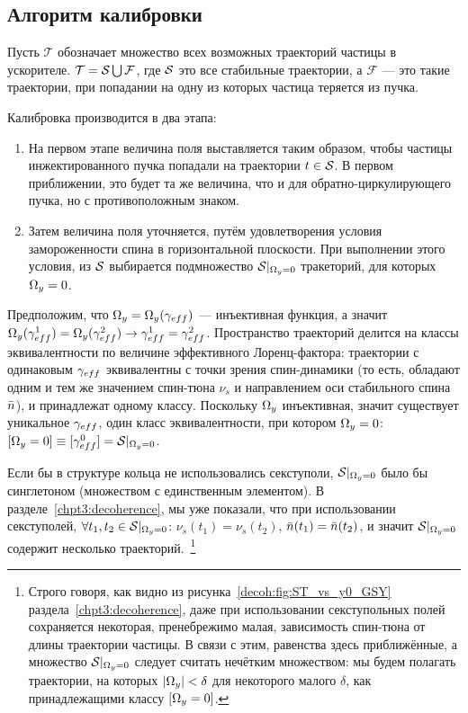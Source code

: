 
\newcommand{\Traj}{\mathcal T}
\newcommand{\Fail}{\mathcal F}
\renewcommand{\D}{\mathcal D}

\subsection{Алгоритм калибровки}
Пусть $\Traj$ обозначает множество всех возможных траекторий частицы в ускорителе. $\Traj = \Stab \bigcup \Fail$,
где $\Stab$ это все стабильные траектории, а $\Fail$ --- это такие траектории,
при попадании на одну из которых частица теряется из пучка.

Калибровка производится в два этапа:
\begin{enumerate}
\item На первом этапе величина поля выставляется таким образом, чтобы частицы инжектированного пучка
попадали на траектории $t\in \Stab$. В первом приближении, это будет та же величина,
что и для обратно-циркулирующего пучка, но с противоположным знаком.
\item Затем величина поля уточняется, путём удовлетворения условия замороженности спина в горизонтальной
плоскости. При выполнении этого условия, из $\Stab$ выбирается подмножество $\Stab*$ тракеторий, для которых
$\Omega_y = 0$.
\end{enumerate}

Предположим, что $\W_y = \W_y(\g*)$ --- инъективная функция, а значит
$\W_y(\g*^1) = \W_y(\g*^2) \rightarrow \g*^1 = \g*^2$. Пространство траекторий делится на
классы эквивалентности по величине эффективного Лоренц-фактора: траектории с одинаковым $\g*$ эквивалентны
с точки зрения спин-динамики (то есть, обладают одним и тем же значением спин-тюна $\nu_s$ и направлением
оси стабильного спина $\bar n$), и принадлежат одному классу. Поскольку $\Omega_y$ инъективная, значит существует
уникальное $\g*$, один класс эквивалентности, при котором $\Omega_y=0$: $[\W_y=0]\equiv [\g*^0] = \Stab*$.

Если бы в структуре кольца не использовались секступоли, $\Stab*$ было бы синглетоном (множеством с
единственным элементом). В разделе~\ref{chpt3:decoherence}, мы уже показали, что
при использовании секступолей, $\forall t_1,t_2\in\Stab*$:
$\nu_s(t_1) = \nu_s(t_2)$, $\bar n(t_1) = \bar n(t_2)$, и значит $\Stab*$ содержит
несколько траекторий.~\footnote{Строго говоря, как видно из рисунка~\ref{decoh:fig:ST_vs_y0_GSY}
раздела~\ref{chpt3:decoherence}, даже при использовании секступольных полей сохраняется некоторая,
пренебрежимо малая, зависимость спин-тюна от длины траектории частицы. В связи с этим, равенства
здесь приближённые, а множество $\Stab*$ следует считать нечётким множеством: мы будем полагать траектории,
на которых $|\Omega_y| < \delta$ для некоторого малого $\delta$, как принадлежащими классу $[\Omega_y=0]$.}

